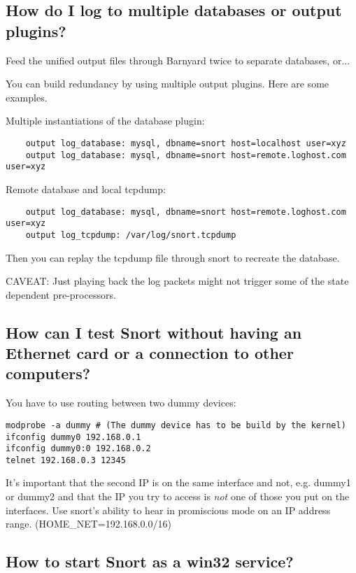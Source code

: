 \documentclass{article}
\begin{document}
\subsection{How do I log to multiple databases or output plugins?}

Feed the unified output files through Barnyard twice to separate databases,
or...

You can build redundancy by using multiple output plugins. Here are some
examples.

Multiple instantiations of the database plugin:
\begin{verbatim}
    output log_database: mysql, dbname=snort host=localhost user=xyz
    output log_database: mysql, dbname=snort host=remote.loghost.com user=xyz
\end{verbatim}
Remote database and local tcpdump:
\begin{verbatim}
    output log_database: mysql, dbname=snort host=remote.loghost.com user=xyz
    output log_tcpdump: /var/log/snort.tcpdump
\end{verbatim}
Then you can replay the tcpdump file through snort to recreate the database.

CAVEAT: Just playing back the log packets might not trigger some of the state
dependent pre-processors.

\subsection{How can I test Snort without having an Ethernet card or a connection to other computers?  }

You have to use routing between two dummy devices: 

\begin{verbatim}
modprobe -a dummy # (The dummy device has to be build by the kernel) 
ifconfig dummy0 192.168.0.1 
ifconfig dummy0:0 192.168.0.2  
telnet 192.168.0.3 12345 
\end{verbatim}

It's important that the second IP is on the same interface and not, e.g.
dummy1 or dummy2 and that the IP you try to access is {\em not} one of those you
put on the interfaces. Use snort's ability to hear in promiscious mode on an
IP address range. (HOME\_NET=192.168.0.0/16)

\subsection{How to start Snort as a win32 service? }
\end{document}
